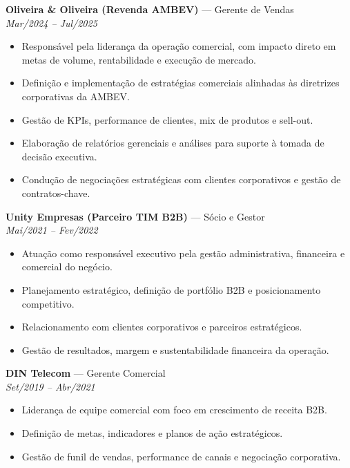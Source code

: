 \documentclass[11pt,a4paper]{article}
\begin{document}
\vspace{10pt}

\textbf{Oliveira \& Oliveira (Revenda AMBEV)} — Gerente de Vendas\\
\textit{Mar/2024 -- Jul/2025}

\begin{itemize}
\item Responsável pela liderança da operação comercial, com impacto direto em metas de volume, rentabilidade e execução de mercado.
\item Definição e implementação de estratégias comerciais alinhadas às diretrizes corporativas da AMBEV.
\item Gestão de KPIs, performance de clientes, mix de produtos e sell-out.
\item Elaboração de relatórios gerenciais e análises para suporte à tomada de decisão executiva.
\item Condução de negociações estratégicas com clientes corporativos e gestão de contratos-chave.
\end{itemize}

\vspace{10pt}

\textbf{Unity Empresas (Parceiro TIM B2B)} — Sócio e Gestor\\
\textit{Mai/2021 -- Fev/2022}

\begin{itemize}
\item Atuação como responsável executivo pela gestão administrativa, financeira e comercial do negócio.
\item Planejamento estratégico, definição de portfólio B2B e posicionamento competitivo.
\item Relacionamento com clientes corporativos e parceiros estratégicos.
\item Gestão de resultados, margem e sustentabilidade financeira da operação.
\end{itemize}

\vspace{10pt}

\textbf{DIN Telecom} — Gerente Comercial\\
\textit{Set/2019 -- Abr/2021}

\begin{itemize}
\item Liderança de equipe comercial com foco em crescimento de receita B2B.
\item Definição de metas, indicadores e planos de ação estratégicos.
\item Gestão de funil de vendas, performance de canais e negociação corporativa.
\end{itemize}
\end{document}
